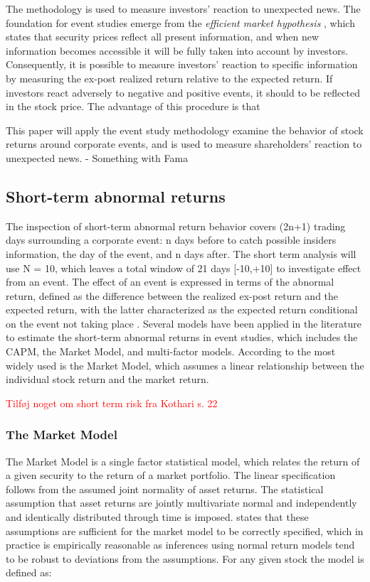 The methodology is used to measure investors' reaction to unexpected news. The foundation for event studies emerge from the \textit{efficient market hypothesis} \citep{fama1969_EMH}, which states that security prices reflect all present information, and when new information becomes accessible it will be fully taken into account by investors. Consequently, it is possible to measure investors' reaction to specific information by measuring the ex-post realized return relative to the expected return. If investors react adversely to negative and positive events, it should to be reflected in the stock price. The advantage of this procedure is that 


This paper will apply the event study methodology examine the behavior of stock returns around corporate events, and is used to measure shareholders' reaction to unexpected news. 
- Something with Fama


\subsection{Short-term abnormal returns}

The inspection of short-term abnormal return behavior covers (2n+1) trading days surrounding a corporate event: n days before to catch possible insiders information, the day of the event, and n days after. The short term analysis will use N = 10, which leaves a total window of 21 days [-10,+10] to investigate effect from an event. The effect of an event is expressed in terms of the abnormal return, defined as the difference between the realized ex-post return and the expected return, with the latter characterized as the expected return conditional on the event not taking place \citep{Event_studies}. Several models have been applied in the literature to estimate the short-term abnormal returns in event studies, which includes the CAPM, the Market Model, and multi-factor models. According to \cite{holler2014event} the most widely used is the Market Model, which assumes a linear relationship between the individual stock return and the market return. 

 \textcolor{red}{Tilføj noget om short term risk fra Kothari s. 22} 

\subsubsection{The Market Model}

The Market Model is a single factor statistical model, which relates the return of a given security to the return of a market portfolio. The linear specification follows from the assumed joint normality of asset returns. The statistical assumption that asset returns are jointly multivariate normal and independently and identically distributed through time is imposed. \cite{Event_studies} states that these assumptions are sufficient for the market model to be correctly specified, which in practice is empirically reasonable as inferences using normal return models tend to be robust to deviations from the assumptions. For any given stock the model is defined as:

